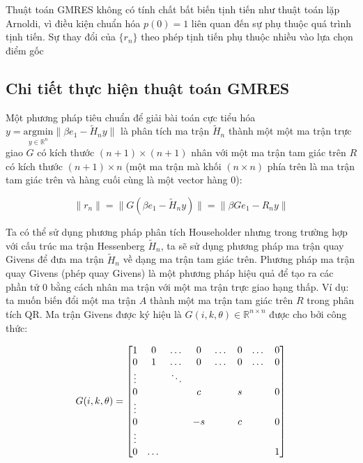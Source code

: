 \documentclass[14pt, a4paper]{article}
\numberwithin{equation}{section}
\numberwithin{algorithm}{section}
\numberwithin{figure}{section}
\numberwithin{dl}{section}
\numberwithin{md}{section}
\numberwithin{bd}{section}
\begin{document}
Thuật toán GMRES không có tính chất bất biến tịnh tiến như thuật toán lặp Arnoldi, vì điều kiện chuẩn hóa $p(0)=1$ liên quan đến sự phụ thuộc quá trình tịnh tiến. Sự thay đổi của $\lbrace r_n \rbrace$ theo phép tịnh tiến phụ thuộc nhiều vào lựa chọn điểm gốc

\subsection{Chi tiết thực hiện thuật toán GMRES}

Một phương pháp tiêu chuẩn để giải bài toán cực tiểu hóa $y = \underset{y \in \mathbb{R}^{n}}{\mathrm{argmin}} \lVert \beta e_1 - \widetilde{H}_n y \rVert$ là phân tích ma trận $\widetilde{H}_n$ thành một một ma trận trực giao $G$ có kích thước $(n+1) \times (n+1)$ nhân với một ma trận tam giác trên $R$ có kích thước $(n+1) \times n$ (một ma trận mà khối $(n \times n)$ phía trên là ma trận tam giác trên và hàng cuối cùng là một vector hàng 0):

\begin{equation} \label{eq:Givens-Apply}
    \lVert r_n \rVert = \lVert G(\beta e_1 - \widetilde{H}_n y) \rVert = \lVert \beta G e_1 - R_n y \rVert
\end{equation}


Ta có thể sử dụng phương pháp phân tích Householder nhưng trong trường hợp với cấu trúc ma trận Hessenberg $\widetilde{H}_n$, ta sẽ sử dụng phương pháp ma trận quay Givens để đưa ma trận $\widetilde{H}_n$ về dạng ma trận tam giác trên.
Phương pháp ma trận quay Givens (phép quay Givens) là một phương pháp hiệu quả để tạo ra các phần tử 0 bằng cách nhân ma trận với một ma trận trực giao hạng thấp. Ví dụ: ta muốn biến đổi một ma trận $A$ thành một ma trận tam giác trên $R$ trong phân tích QR.
Ma trận Givens được ký hiệu là $G(i, k, \theta) \in \mathbb{R}^{n \times n}$ được cho bởi công thức:

\begin{equation}
    G(i, k, \theta) = \begin{bmatrix} 1 & 0 & \dots & 0 & \dots & 0 & \dots & 0 \\
                                    0 & 1 & \dots & 0 & \dots & 0 & \dots & 0 \\
                                    \vdots & \thickspace & \ddots & \thickspace & \thickspace & \thickspace & \thickspace \\
                                    0 & \thickspace & \space & c & \thickspace & s & \thickspace & 0 \\
                                    \vdots \\
                                    0 & \thickspace & \space & -s & \thickspace & c & \thickspace & 0 \\
                                    \vdots \\
                                    0 & \dots & \thickspace & \thickspace & \thickspace & \thickspace & \space & 1    \end{bmatrix}
\end{equation}
\end{document}
